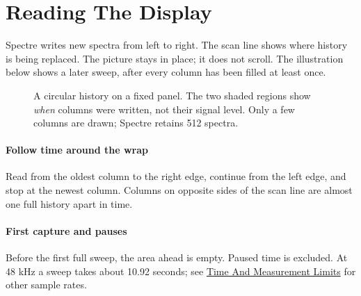 \section{Reading The Display}\label{sec:display}

Spectre writes new spectra from left to right. The scan line shows where
history is being replaced. The picture stays in place; it does not scroll.
The illustration below shows a later sweep, after every column has been
filled at least once.

\begin{figure}[!htp]
\centering
\resizebox{.88\textwidth}{!}{}
\caption{A circular history on a fixed panel. The two shaded regions show
\emph{when} columns were written, not their signal level. Only a few columns
are drawn; Spectre retains 512 spectra.}
\label{fig:history}
\end{figure}

\paragraph{Follow time around the wrap}
Read from the oldest column to the right edge, continue from the left edge,
and stop at the newest column. Columns on opposite sides of the scan line
are almost one full history apart in time.

\paragraph{First capture and pauses}
Before the first full sweep, the area ahead is empty. Paused time is excluded.
At 48 kHz a sweep takes about 10.92 seconds; see
\hyperref[sec:time]{Time And Measurement Limits} for other sample rates.

